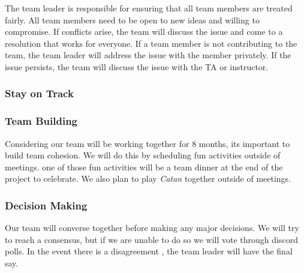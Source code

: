 \documentclass{article}
\begin{document}
\raggedright
The team leader is responsible for ensuring that all team members are treated fairly.
All team members need to be open to new ideas and willing to compromise. If conflicts
arise, the team will discuss the issue and come to a resolution that works for everyone.
If a team member is not contributing to the team, the team leader will address the issue
with the member privately. If the issue persists, the team will discuss the issue with
the TA or instructor.

\subsubsection*{Stay on Track}




\subsubsection*{Team Building}


\raggedright
Considering our team will be working together for 8 months, its important to build
team cohesion. We will do this by scheduling fun activities outside of meetings. one
of those fun activities will be a team dinner at the end of the project to celebrate.
We also plan to play \textit{Catan} together outside of meetings. 

\subsubsection*{Decision Making} 


\raggedright
Our team will converse together before making any major decisions. We will try to reach
a consensus, but if we are unable to do so we will vote through discord polls. In the event
there is a disagreement , the team leader will have the final say.
\end{document}
